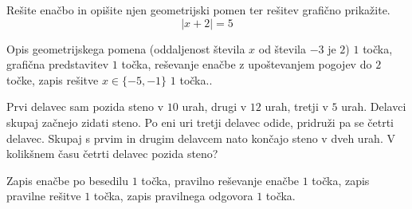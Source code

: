 \documentclass[addpoints]{exam}
\begin{document}
\begin{questions}
    \question[5]
    Rešite enačbo in opišite njen geometrijski pomen ter rešitev grafično prikažite.
    $$  \left\lvert x+2\right\rvert=5 $$
    
    
    \begin{solution}[7cm]
        Opis geometrijskega pomena (oddaljenost števila $x$ od števila $-3$ je $2$) $1$ točka, grafična predstavitev $1$ točka, reševanje enačbe z upoštevanjem pogojev do $2$ točke, zapis rešitve $x\in\{-5,-1\}$ $1$ točka..
    \end{solution}


    \newpage





    
    



    \question[5]
    Prvi delavec sam pozida steno v $10$ urah, drugi v $12$ urah, tretji v $5$ urah. Delavci
    skupaj začnejo zidati steno. Po eni uri tretji delavec odide, pridruži pa se četrti delavec.
    Skupaj s prvim in drugim delavcem nato končajo steno v dveh urah. V kolikšnem času četrti delavec
    pozida steno?
    
    
    \begin{solution}[13cm]
        Zapis enačbe po besedilu $1$ točka, pravilno reševanje enačbe $1$ točka, zapis pravilne rešitve $1$ točka, zapis pravilnega odgovora $1$ točka.
    \end{solution}






    



    

\end{questions}
\end{document}
